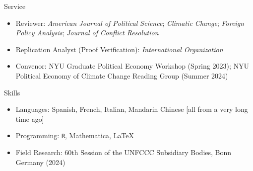 \documentclass{resume} %
\begin{document}
\begin{rSection}{Service}
\begin{itemize}
\item Reviewer:  \textit{American Journal of Political Science};  \textit{Climatic Change}; \textit{Foreign Policy Analysis}; \textit{Journal of Conflict Resolution}

\item Replication Analyst (Proof Verification):  \textit{International Organization} 
\item Convenor: NYU Graduate Political Economy Workshop (Spring 2023); NYU Political Economy of Climate Change Reading Group (Summer 2024)
\end{itemize}
 \end{rSection}

\begin{rSection}{Skills}
\begin{itemize}
\item Languages: Spanish, French, Italian, Mandarin Chinese [all from a very long time ago]
\item Programming: \texttt{R}, Mathematica, \LaTeX
\item Field Research: 60th Session of the UNFCCC Subsidiary Bodies, Bonn Germany (2024) 
\end{itemize}
\end{rSection}
\end{document}
